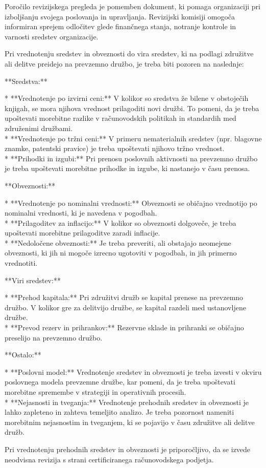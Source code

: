 \documentclass[a4paper,12pt,openright]{book}
\begin{document}
\begin{mdframed}[linewidth=1pt]
	\raggedright
	\ttfamily
	Poročilo revizijskega pregleda je pomemben dokument, ki pomaga organizaciji pri izboljšanju svojega poslovanja in upravljanja. Revizijski komisiji omogoča informiran sprejem odločitev glede finančnega stanja, notranje kontrole in varnosti sredstev organizacije.

	Pri vrednotenju sredstev in obveznosti do vira sredstev, ki na podlagi združitve ali delitve preidejo na prevzemno družbo, je treba biti pozoren na naslednje:

	**Sredstva:**

	* **Vrednotenje po izvirni ceni:** V kolikor so sredstva že bilene v obstoječih knjigah, se mora njihova vrednost prilagoditi novi družbi. To pomeni, da je treba upoštevati morebitne razlike v računovodskih politikah in standardih med združenimi družbami. \\
	* **Vrednotenje po tržni ceni:** V primeru nematerialnih sredstev (npr. blagovne znamke, patentski pravice) je treba upoštevati njihovo tržno vrednost. \\
	* **Prihodki in izgubi:** Pri prenosu poslovnih aktivnosti na prevzemno družbo je treba upoštevati morebitne prihodke in izgube, ki nastanejo v času prenosa.

	**Obveznosti:**

	* **Vrednotenje po nominalni vrednosti:** Obveznosti se običajno vrednotijo po nominalni vrednosti, ki je navedena v pogodbah. \\
	* **Prilagoditev za inflacijo:** V kolikor so obveznosti dolgoveče, je treba upoštevati morebitne prilagoditve zaradi inflacije. \\
	* **Nedoločene obveznosti:** Je treba preveriti, ali obstajajo neomejene obveznosti, ki jih ni mogoče izrecno ugotoviti v pogodbah, in jih primerno vrednotiti.

	**Viri sredstev:**

	* **Prehod kapitala:** Pri združitvi družb se kapital prenese na prevzemno družbo. V kolikor gre za delitvijo družbe, se kapital razdeli med ustanovljene družbe. \\
	* **Prevod rezerv in prihrankov:** Rezervne sklade in prihranki se običajno preselijo na prevzemno družbo.

	**Ostalo:**

	* **Poslovni model:** Vrednotenje sredstev in obveznosti je treba izvesti v okviru poslovnega modela prevzemne družbe, kar pomeni, da je treba upoštevati morebitne spremembe v strategiji in operativnih procesih. \\
	* **Nejasnosti in tveganja:** Vrednotenje prehodnih sredstev in obveznosti je lahko zapleteno in zahteva temeljito analizo. Je treba pozornost nameniti morebitnim nejasnostim in tveganjem, ki se pojavijo v času združitve ali delitve družb.

	Pri vrednotenju prehodnih sredstev in obveznosti je priporočljivo, da se izvede neodvisna revizija s strani certificiranega računovodskega podjetja.
\end{mdframed}
\end{document}
